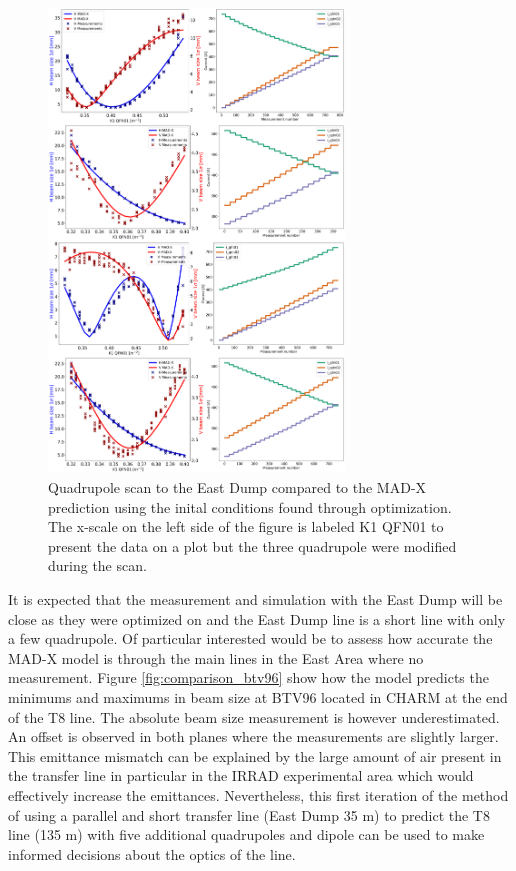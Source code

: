 \begin{figure}[htbp]
\centering
\includegraphics[width=0.7\textwidth]{03_Empirical_Measurements/images/combine_quadrupole_scan_east_dump.png}
\caption{Quadrupole scan to the East Dump compared to the MAD-X prediction using the inital conditions found through optimization. The x-scale on the left side of the figure is labeled K1 QFN01 to present the data on a plot but the three quadrupole were modified during the scan.}
\label{fig:combined_measurements}
\end{figure}

It is expected that the measurement and simulation with the East Dump will be close as they were optimized on and the East Dump line is a short line with only a few quadrupole. Of particular interested would be to assess how accurate the MAD-X model is through the main lines in the East Area where no measurement. Figure \ref{fig:comparison_btv96} show how the model predicts the minimums and maximums in beam size at BTV96 located in CHARM at the end of the T8 line. The absolute beam size measurement is however underestimated. An offset is observed in both planes where the measurements are slightly larger. This emittance mismatch can be explained by the large amount of air present in the transfer line in particular in the IRRAD experimental area which would effectively increase the emittances. Nevertheless, this first iteration of the method of using a parallel and short transfer line (East Dump 35 m) to predict the T8 line (135 m) with five additional quadrupoles and dipole can be used to make informed decisions about the optics of the line.

